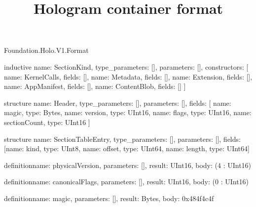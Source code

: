 \begin{lexlean}{Foundation.Holo.V1.Format}
\title{Hologram container format}
\begin{semanticmodule}
inductive{
  name: SectionKind,
  type_parameters: [],
  parameters: [],
  constructors: [
    {name: KernelCalls, fields: []},
    {name: Metadata, fields: []},
    {name: Extension, fields: []},
    {name: AppManifest, fields: []},
    {name: ContentBlob, fields: []}
  ]
}

structure{
  name: Header,
  type_parameters: [],
  parameters: [],
  fields: [
    {name: magic, type: Bytes},
    {name: version, type: UInt16},
    {name: flags, type: UInt16},
    {name: sectionCount, type: UInt16}
  ]
}

structure{
  name: SectionTableEntry,
  type_parameters: [],
  parameters: [],
  fields: [{name: kind, type: UInt8}, {name: offset, type: UInt64}, {name: length, type: UInt64}]
}

definition{name: physicalVersion, parameters: [], result: UInt16, body: (4 : UInt16)}

definition{name: canonicalFlags, parameters: [], result: UInt16, body: (0 : UInt16)}

definition{name: magic, parameters: [], result: Bytes, body: 0x484f4c4f}
\end{semanticmodule}
\end{lexlean}
